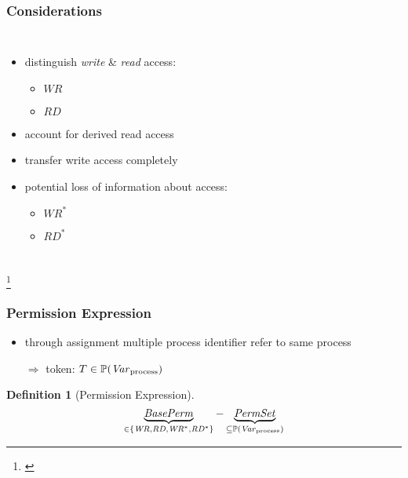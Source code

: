 \documentclass{beamer}
\newtheorem{defi}{Definition}
\renewenvironment{definition}
	{\begin{mdframed}[nobreak=true]\begin{defi}}
	{\end{defi}\end{mdframed}}
\newcommand\blfootnote[1]{%
	\begingroup
	\renewcommand\thefootnote{}\footnote{#1}%
	\addtocounter{footnote}{-1}%
	\endgroup
}
\begin{document}
\begin{frame}
	\frametitle{Considerations}
	\begin{columns}
		\begin{itemize}
			\item distinguish \emph{write} \& \emph{read} access:
				\begin{itemize}
					\item $\mathit{WR}$
					\item $\mathit{RD}$
				\end{itemize}
			\item account for derived read access
			\item transfer write access completely
			\item<3-> potential loss of information about access:
				\begin{itemize}
					\item<3-> $\mathit{WR}^{\ast}$
					\item<3-> $\mathit{RD}^{\ast}$
				\end{itemize}
		\end{itemize}
	\end{columns}
	\blfootnote{\cite{FractionalPermissions}}
\end{frame}

\begin{frame}
	\frametitle{Permission Expression}
	\begin{itemize}
		\item through assignment multiple process identifier refer to same
			process
		\item[$\Rightarrow$] token: $T\in\mathbb{P}(\mathit{Var}_{\text{process}})$
	\end{itemize}
	\pause
	\begin{definition}[Permission Expression]
		\begin{equation*}
			\underbrace{\mathit{BasePerm}}_{\in\left\{\mathit{WR}, \mathit{RD},
			\mathit{WR}^{\ast}, \mathit{RD}^{\ast}\right\}} -
			\underbrace{\mathit{PermSet}}_{\subseteq\mathbb{P}(\mathit{Var}_{\text{process}})}
		\end{equation*}
	\end{definition}
\end{frame}
\end{document}
